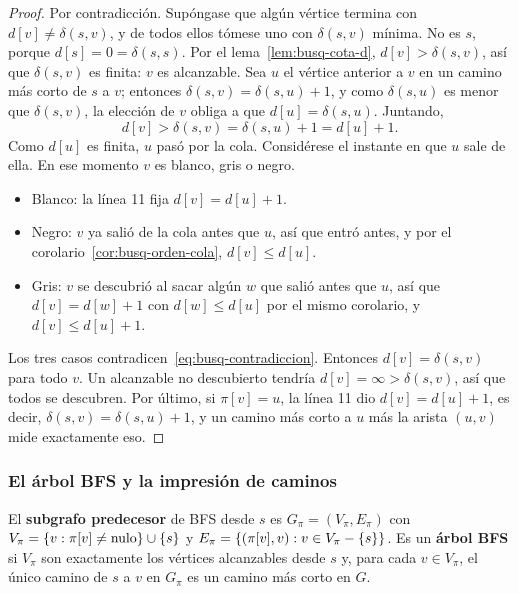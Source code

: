 \documentclass[11pt,letterpaper]{article}
\begin{document}
\begin{proof}
  Por contradicción. Supóngase que algún vértice termina con
  $d[v] \neq \delta(s, v)$, y de todos ellos tómese uno con
  $\delta(s, v)$ mínima. No es $s$, porque $d[s] = 0 = \delta(s, s)$.
  Por el lema~\ref{lem:busq-cota-d}, $d[v] > \delta(s, v)$, así que
  $\delta(s, v)$ es finita: $v$ es alcanzable. Sea $u$ el vértice
  anterior a $v$ en un camino más corto de $s$ a $v$; entonces
  $\delta(s, v) = \delta(s, u) + 1$, y como $\delta(s, u)$ es menor
  que $\delta(s, v)$, la elección de $v$ obliga a que
  $d[u] = \delta(s, u)$. Juntando,
  \begin{equation}
    d[v] > \delta(s, v) = \delta(s, u) + 1 = d[u] + 1 .
    \tag{$\ast$} \label{eq:busq-contradiccion}
  \end{equation}
  Como $d[u]$ es finita, $u$ pasó por la cola. Considérese el instante
  en que $u$ sale de ella. En ese momento $v$ es blanco, gris o negro.
  \begin{itemize}[itemsep=0.1em]
    \item Blanco: la línea 11 fija $d[v] = d[u] + 1$.
    \item Negro: $v$ ya salió de la cola antes que $u$, así que entró
      antes, y por el corolario~\ref{cor:busq-orden-cola},
      $d[v] \leq d[u]$.
    \item Gris: $v$ se descubrió al sacar algún $w$ que salió antes
      que $u$, así que $d[v] = d[w] + 1$ con $d[w] \leq d[u]$ por el
      mismo corolario, y $d[v] \leq d[u] + 1$.
  \end{itemize}
  Los tres casos contradicen~\eqref{eq:busq-contradiccion}. Entonces
  $d[v] = \delta(s, v)$ para todo $v$. Un alcanzable no descubierto
  tendría $d[v] = \infty > \delta(s, v)$, así que todos se descubren.
  Por último, si $\pi[v] = u$, la línea 11 dio
  $d[v] = d[u] + 1$, es decir, $\delta(s, v) = \delta(s, u) + 1$, y
  un camino más corto a $u$ más la arista $(u, v)$ mide exactamente
  eso.
\end{proof}


\subsubsection*{El árbol BFS y la impresión de caminos}

\begin{definicion}
  El \textbf{subgrafo predecesor} de BFS desde $s$ es
  $G_\pi = (V_\pi, E_\pi)$ con
  $V_\pi = \left\{ v : \pi[v] \neq \text{nulo} \right\} \cup \left\{ s \right\}$ y
  $E_\pi = \left\{ (\pi[v], v) : v \in V_\pi - \left\{ s \right\} \right\}$. Es un
  \textbf{árbol BFS} si $V_\pi$ son exactamente los vértices
  alcanzables desde $s$ y, para cada $v \in V_\pi$, el único camino de
  $s$ a $v$ en $G_\pi$ es un camino más corto en $G$.
\end{definicion}
\end{document}
